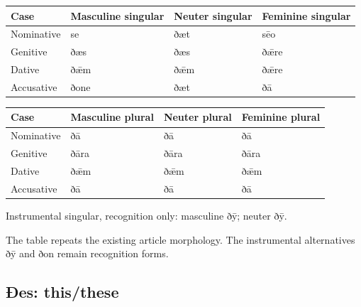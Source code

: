 \par\begingroup
\fontsize{10.5}{13.2}\selectfont
\setlength{\LTleft}{0pt}\setlength{\LTright}{\fill}
\noindent
\begin{tabular}{@{}>{\raggedright\arraybackslash}p{22.0mm}>{\raggedright\arraybackslash}p{31.188mm}>{\raggedright\arraybackslash}p{31.188mm}>{\raggedright\arraybackslash}p{31.188mm}@{}}
\toprule
\textbf{Case} & \textbf{Masculine singular} & \textbf{Neuter singular} & \textbf{Feminine singular} \\
\midrule
Nominative & se & ðæt & sēo \\
Genitive & ðæs & ðæs & ðǣre \\
Dative & ðǣm & ðǣm & ðǣre \\
Accusative & ðone & ðæt & ðā \\
\bottomrule
\end{tabular}
\par\endgroup
\par\addvspace{5pt}
\par\begingroup
\fontsize{10.5}{13.2}\selectfont
\setlength{\LTleft}{0pt}\setlength{\LTright}{\fill}
\noindent
\begin{tabular}{@{}>{\raggedright\arraybackslash}p{22.0mm}>{\raggedright\arraybackslash}p{31.188mm}>{\raggedright\arraybackslash}p{31.188mm}>{\raggedright\arraybackslash}p{31.188mm}@{}}
\toprule
\textbf{Case} & \textbf{Masculine plural} & \textbf{Neuter plural} & \textbf{Feminine plural} \\
\midrule
Nominative & ðā & ðā & ðā \\
Genitive & ðāra & ðāra & ðāra \\
Dative & ðǣm & ðǣm & ðǣm \\
Accusative & ðā & ðā & ðā \\
\bottomrule
\end{tabular}
\par\endgroup
Instrumental singular, recognition only: masculine ðȳ; neuter ðȳ.

The table repeats the existing article morphology. The instrumental alternatives ðȳ and ðon remain recognition forms.

\subsection*{Ðes: this/\allowbreak{}these}

